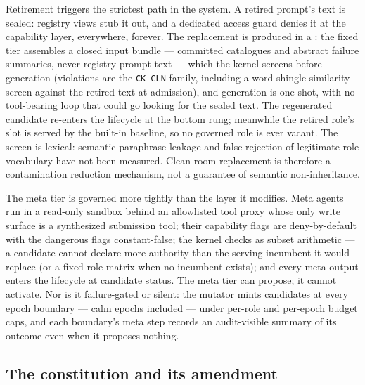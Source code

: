 Retirement triggers the strictest path in the system. A retired
prompt's text is sealed: registry views stub it out, and a dedicated
access guard denies it at the capability layer, everywhere, forever.
The replacement is produced in a : the fixed tier
assembles a closed input bundle --- committed catalogues and abstract
failure summaries, never registry prompt text --- which the kernel
screens before generation (violations are the \texttt{CK-CLN}
family, including a word-shingle similarity screen against the
retired text at admission), and generation is one-shot, with no
tool-bearing loop that could go looking for the sealed text. The
regenerated candidate re-enters the lifecycle at the bottom rung;
meanwhile the retired role's slot is served by the built-in baseline,
so no governed role is ever vacant. The screen is lexical: semantic
paraphrase leakage and false rejection of legitimate role vocabulary have
not been measured. Clean-room replacement is therefore a contamination
reduction mechanism, not a guarantee of semantic non-inheritance.

The meta tier is governed more tightly than the layer it modifies.
Meta agents run in a read-only sandbox behind an allowlisted tool
proxy whose only write surface is a synthesized submission tool;
their capability flags are deny-by-default with the dangerous flags
constant-false; the kernel checks  as
subset arithmetic --- a candidate cannot declare more authority than
the serving incumbent it would replace (or a fixed role matrix when no
incumbent exists); and every meta output enters the lifecycle
at candidate status. The meta tier can propose; it cannot activate.
Nor is it failure-gated or silent: the mutator mints candidates at
every epoch boundary --- calm epochs included --- under per-role and
per-epoch budget caps, and each boundary's meta step records an
audit-visible summary of its outcome even when it proposes nothing.

\subsection{The constitution and its amendment}\label{sec:rqgm:constitution}

